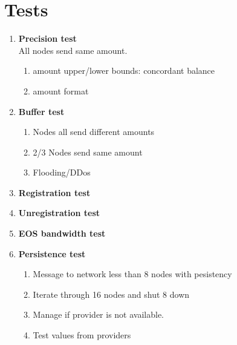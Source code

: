 \documentclass[]{article}
\begin{document}
\section{Tests}

					\begin{enumerate}
						
					\item \textbf{Precision test}\\
					All nodes send same amount.
						\begin{enumerate}
						\item amount upper/lower bounds: concordant balance
						\item amount format  
						\end{enumerate}
					\item \textbf{Buffer test}\\
					\begin{enumerate}
						\item Nodes all send different amounts 
						\item 2/3 Nodes send same amount
						\item Flooding/DDos  
					\end{enumerate}
						\item \textbf{Registration test}\\
						\item \textbf{Unregistration test}\\
						\item \textbf{EOS bandwidth test}\\
						\item \textbf{Persistence test}\\
							\begin{enumerate}
								\item Message to network less than 8 nodes with pesistency
								\item Iterate through 16 nodes and shut 8 down
								\item Manage if provider is not available.
								\item Test values from providers
							\end{enumerate}
				\end{enumerate}
	
\end{document}
